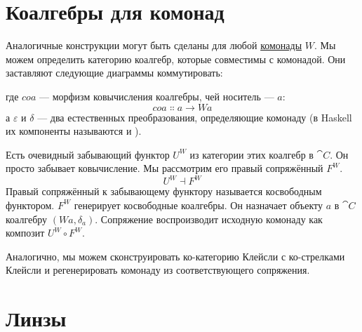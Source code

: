 \section{Коалгебры для комонад}

Аналогичные конструкции могут быть сделаны для любой
\hyperref[comonads]{комонады}
$W$. Мы можем определить категорию коалгебр, которые совместимы
с комонадой. Они заставляют следующие диаграммы коммутировать:

\begin{figure}[H]
  \centering
  \begin{subfigure}
    \centering
  \end{subfigure}%
  \hspace{1cm}
  \begin{subfigure}
    \centering
  \end{subfigure}
\end{figure}

\noindent
где $\mathit{coa}$ --- морфизм ковычисления коалгебры, чей
носитель --- $a$:
\[\mathit{coa} \Colon a \to W a\]
а $\varepsilon$ и $\delta$ --- два естественных преобразования,
определяющие комонаду (в Haskell их компоненты называются
 и ).

Есть очевидный забывающий функтор $U^W$ из категории
этих коалгебр в $\cat{C}$. Он просто забывает ковычисление. Мы
рассмотрим его правый сопряжённый $F^W$.
\[U^W \dashv F^W\]
Правый сопряжённый к забывающему функтору называется косвободным функтором.
$F^W$ генерирует косвободные коалгебры. Он назначает объекту
$a$ в $\cat{C}$ коалгебру $(W a, \delta_a)$.
Сопряжение воспроизводит исходную комонаду как композит
$U^W \circ F^W$.

Аналогично, мы можем сконструировать ко-категорию Клейсли с ко-стрелками Клейсли
и регенерировать комонаду из соответствующего сопряжения.

\section{Линзы}

